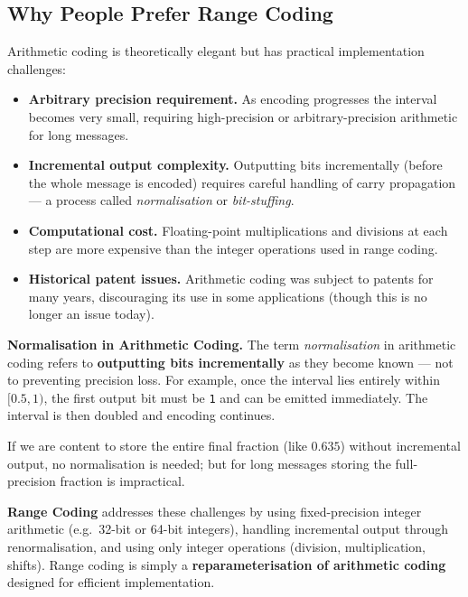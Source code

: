 \subsection{Why People Prefer Range Coding}

Arithmetic coding is theoretically elegant but has practical implementation
challenges:

\begin{itemize}[leftmargin=2em]
    \item \textbf{Arbitrary precision requirement.} As encoding progresses the
          interval becomes very small, requiring high-precision or
          arbitrary-precision arithmetic for long messages.
    \item \textbf{Incremental output complexity.} Outputting bits
          incrementally (before the whole message is encoded) requires careful
          handling of carry propagation — a process called
          \emph{normalisation} or \emph{bit-stuffing}.
    \item \textbf{Computational cost.} Floating-point multiplications and
          divisions at each step are more expensive than the integer operations
          used in range coding.
    \item \textbf{Historical patent issues.} Arithmetic coding was subject to
          patents for many years, discouraging its use in some applications
          (though this is no longer an issue today).
\end{itemize}

\begin{importantbox}
\textbf{Normalisation in Arithmetic Coding.}
The term \emph{normalisation} in arithmetic coding refers to
\textbf{outputting bits incrementally} as they become known — not to
preventing precision loss.  For example, once the interval lies entirely
within $[0.5, 1)$, the first output bit must be \texttt{1} and can be
emitted immediately. The interval is then doubled and encoding continues.

If we are content to store the entire final fraction (like $0.635$) without
incremental output, no normalisation is needed; but for long messages storing
the full-precision fraction is impractical.
\end{importantbox}

\textbf{Range Coding} addresses these challenges by using fixed-precision
integer arithmetic (e.g.\ 32-bit or 64-bit integers), handling incremental
output through renormalisation, and using only integer operations (division,
multiplication, shifts). Range coding is simply a
\textbf{reparameterisation of arithmetic coding} designed for efficient
implementation.

